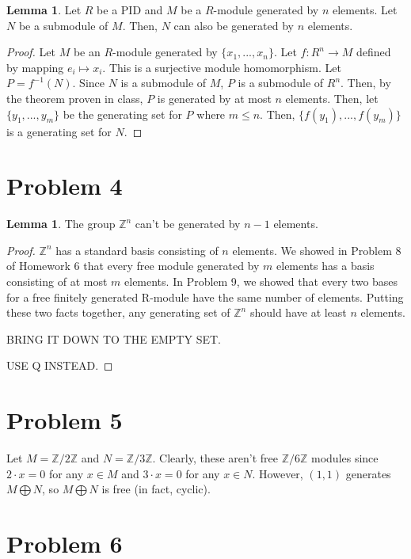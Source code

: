 \documentclass{article}
\theoremstyle{definition}
\newtheorem{lemma}[theorem]{Lemma}
\newcommand{\Z}{\mathbb{Z}}
\begin{document}
\begin{lemma}
    Let $R$ be a PID and $M$ be a $R$-module generated by $n$ elements. Let $N$ be a submodule of $M$. Then, $N$ can also be generated by $n$ elements.
\end{lemma}
\begin{proof}
    Let $M$ be an $R$-module generated by $\{ x_{1}, ..., x_{n} \}$. Let $f: R^{n} \xrightarrow{} M$ defined by mapping $e_{i} \mapsto x_{i}$. This is a surjective module homomorphism. Let $P = f^{-1}(N)$. Since $N$ is a submodule of $M$, $P$ is a submodule of $R^{n}$. Then, by the theorem proven in class, $P$ is generated by at most $n$ elements. Then, let $\{y_{1},...,y_{m}\}$ be the generating set for $P$ where $m \leq n$. Then, $\{f(y_{1}),...,f(y_{m})\}$ is a generating set for $N$.
\end{proof}

\section{Problem 4}

\begin{lemma}
    The group $\mathbb{Z}^{n}$ can't be generated by $n - 1$ elements.
\end{lemma}
\begin{proof}
    $\mathbb{Z}^{n}$ has a standard basis consisting of $n$ elements. We showed in Problem 8 of Homework 6 that every free module generated by $m$ elements has a basis consisting of at most $m$ elements. In Problem 9, we showed that every two bases for a free finitely generated R-module have the same number of elements. Putting these two facts together, any generating set of $\mathbb{Z}^{n}$ should have at least $n$ elements.

    BRING IT DOWN TO THE EMPTY SET.

    USE Q INSTEAD.
\end{proof}

\section{Problem 5}

Let $M = \Z / 2 \Z$ and $N = \Z / 3 \Z$. Clearly, these aren't free $\Z / 6 \Z$ modules since $2 \cdot x = 0$ for any $x \in M$ and $3 \cdot x = 0$ for any $x \in N$. However, $(1,1)$ generates $M \bigoplus N$, so $M \bigoplus N$ is free (in fact, cyclic).

\section{Problem 6}
\end{document}

